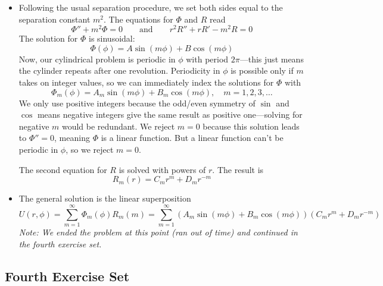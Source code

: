 \documentclass[11pt, a4paper]{article}
\newcommand{\eqtext}[1]{\qquad \text{#1} \qquad}
\begin{document}
\begin{itemize}
	\item Following the usual separation procedure, we set both sides equal to the separation constant $ m^{2} $. The equations for $ \Phi $ and $ R $ read
	\begin{equation*}
		\Phi'' + m^{2} \Phi = 0 \eqtext{and} r^{2}R'' + rR' - m^{2}R = 0
	\end{equation*}
	The solution for $ \Phi $ is sinusoidal:
	\begin{equation*}
		\Phi(\phi) = A \sin(m\phi) + B\cos(m\phi)
	\end{equation*}
	Now, our cylindrical problem is periodic in $ \phi $ with period $ 2\pi $---this just means the cylinder repeats after one revolution. Periodicity in $ \phi $ is possible only if $ m $ takes on integer values, so we can immediately index the solutions for $ \Phi $ with
	\begin{equation*}
		\Phi_{m}(\phi) = A_{m} \sin(m\phi) + B_{m}\cos(m\phi), \quad m = 1, 2, 3, \ldots 
	\end{equation*}
	We only use positive integers because the odd/even symmetry of $ \sin $ and $ \cos $ means negative integers give the same result as positive one---solving for negative $ m $ would be redundant. We reject $ m = 0 $ because this solution leads to $ \Phi'' = 0 $, meaning $ \Phi $ is a linear function. But a linear function can't be periodic in $ \phi $, so we reject $ m = 0 $.
	
	The second equation for $ R $ is solved with powers of $ r $. The result is
	\begin{equation*}
		R_{m}(r) = C_{m}r^{m} + D_{m}r^{-m}
	\end{equation*}
	
	\item The general solution is the linear superposition
	\begin{equation*}
		U(r, \phi) = \sum_{m = 1}^{\infty}\Phi_{m}(\phi)R_{m}(m) = \sum_{m = 1}^{\infty} \left(A_{m} \sin(m\phi) + B_{m}\cos(m\phi)\right)\left( C_{m}r^{m} + D_{m}r^{-m} \right)
	\end{equation*}
	\textit{Note: We ended the problem at this point (ran out of time) and continued in the fourth exercise set.}

	\end{itemize}
	
\subsection{Fourth Exercise Set}
\end{document}
